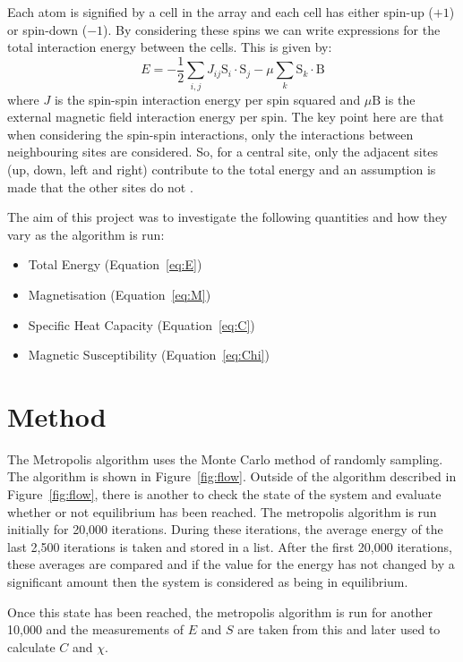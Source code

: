 \documentclass[11pt]{article}
\newcommand{\mathbold}[1]{\boldsymbol{\mathrm{#1}}}
\begin{document}
Each atom is signified by a cell in the array and each cell has either spin-up ($+1$) or spin-down ($-1$). By considering these spins we can write expressions for the total interaction energy between the cells. This is given by:
\begin{equation} \label{eq:E}
E = -\frac{1}{2}\sum_{i, j}J_{ij}\mathbold{S}_{i}\cdot\mathbold{S}_{j} - \mu\sum_{k}\mathbold{S}_{k}\cdot\mathbold{B}
\end{equation}
where $J$ is the spin-spin interaction energy per spin squared and $\mu\mathbold{B}$ is the external magnetic field interaction energy per spin. The key point here are that when considering the spin-spin interactions, only the interactions between neighbouring sites are considered. So, for a central site, only the adjacent sites (up, down, left and right) contribute to the total energy and an assumption is made that the other sites do not \cite{kim}.

The aim of this project was to investigate the following quantities and how they vary as the algorithm is run:
\begin{multicols}{2}
\begin{itemize}
\item Total Energy (Equation~\ref{eq:E})
\item Magnetisation (Equation~\ref{eq:M})
\item Specific Heat Capacity (Equation~\ref{eq:C})
\item Magnetic Susceptibility (Equation~\ref{eq:Chi})
\end{itemize}
\end{multicols}

\section*{Method}
The Metropolis algorithm uses the Monte Carlo method of randomly sampling\cite{kingham}. The algorithm is shown in Figure~\ref{fig:flow}. Outside of the algorithm described in Figure~\ref{fig:flow}, there is another to check the state of the system and evaluate whether or not equilibrium has been reached. The metropolis algorithm is run initially for 20,000 iterations. During these iterations, the average energy of the last 2,500 iterations is taken and stored in a list. After the first 20,000 iterations, these averages are compared and if the value for the energy has not changed by a significant amount then the system is considered as being in equilibrium.

Once this state has been reached, the metropolis algorithm is run for another 10,000 and the measurements of $E$ and $S$ are taken from this and later used to calculate $C$ and $\chi$.
\end{document}

